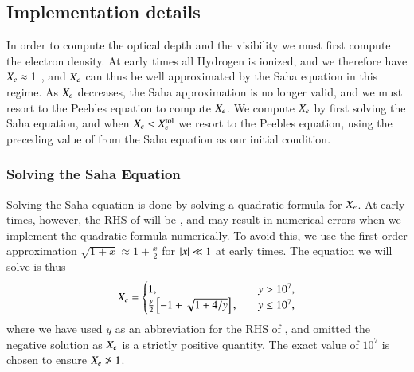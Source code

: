 
\subsection{Implementation details}\label{ssec:M2:implementations} 

In order to compute the optical depth and the visibility we must first compute the electron density. At early times all Hydrogen is ionized, and we therefore have $X_e\approx 1$ , and $X_e$ can thus be well approximated by the Saha equation in this regime. As $X_e$ decreases, the Saha approximation is no longer valid, and we must resort to the Peebles equation to compute $X_e$. We compute $X_e$ by first solving the Saha equation, and when $X_e<X_e^\mathrm{tol}$ we resort to the Peebles equation, using the preceding value of from the Saha equation as our initial condition.   

\subsubsection{Solving the Saha Equation}\label{sssec:M2:implementations:solving_saha}
Solving the Saha equation is done by solving a quadratic formula for $X_e$. At early times, however, the RHS of  will be , and may result in numerical errors when we implement the quadratic formula numerically. To avoid this, we use the first order approximation $\sqrt{1+x}\approx 1 + \frac{x}{2}$ for $\abs{x}\ll1$ at early times. The equation we will solve is thus 
\begin{equation}
    X_e = \begin{cases}
        1, \quad & y>10^7, \\
        \frac{y}{2}\left[ -1 + \sqrt{1 + 4/y} \right],\quad & y\leq 10^7,
    \end{cases}
\end{equation}  
where we have used $y$ as an abbreviation for the RHS of , and omitted the negative solution as $X_e$ is a strictly positive quantity. The exact value of $10^7$ is chosen to ensure $X_e \ngtr 1$. 

